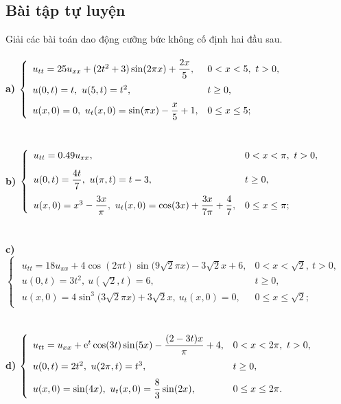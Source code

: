 \documentclass[10pt, a4paper]{article}
\begin{document}
	\subsection{Bài tập tự luyện}
	Giải các bài toán dao động cưỡng bức không cố định hai đầu sau.\\\\
	\textbf{a) } $\begin{cases}
		\begin{array}{ll}
			u_{tt}=25u_{xx}+(2t^2+3)\sin(2\pi x)+\dfrac{2x}{5}, & 0<x<5,~t>0,\\
			\noalign{\vskip5pt}
			u(0,t)=t,~u(5,t)=t^2, & t\ge0,\\
			\noalign{\vskip6pt}
			u(x,0)=0,~u_t(x,0)=\sin(\pi x)-\dfrac x5+1, & 0\le x\le5;
		\end{array}
	\end{cases}$\\\\\\
	\textbf{b) } $\begin{cases}
		\begin{array}{ll}
			u_{tt}=0.49u_{xx}, & 0<x<\pi,~t>0,\\
			\noalign{\vskip8pt}
			u(0,t)=\dfrac{4t}{7},~u(\pi,t)=t-3, & t\ge0,\\
			\noalign{\vskip7pt}
			u(x,0)=x^3-\dfrac{3x}{\pi},~u_t(x,0)=\cos(3x)+\dfrac{3x}{7\pi}+\dfrac47, & 0\le x\le\pi;
		\end{array}
	\end{cases}$\\\\\\
	\textbf{c) } $\begin{cases}
		\begin{array}{ll}
			u_{tt}=18u_{xx}+4\cos(2\pi t)\sin\big(9\sqrt2\pi x\big)-3\sqrt2x+6, & 0<x<\sqrt2,~t>0,\\
			u(0,t)=3t^2,~u(\sqrt2,t)=6,~ & t\ge0,\\
			u(x,0)=4\sin^3\big(3\sqrt2\pi x\big)+3\sqrt2x,~u_t(x,0)=0, & 0\le x\le\sqrt2;
		\end{array}
	\end{cases}$\\\\\\
	\textbf{d) } $\begin{cases}
		\begin{array}{ll}
			u_{tt}=u_{xx}+\mathrm e^t\cos(3t)\sin(5x)-\dfrac{(2-3t)x}{\pi}+4, & 0<x<2\pi,~t>0,\\
			\noalign{\vskip5pt}
			u(0,t)=2t^2,~u(2\pi,t)=t^3, & t\ge0,\\
			\noalign{\vskip6pt}
			u(x,0)=\sin(4x),~u_t(x,0)=\dfrac{8}{3}\sin(2x), & 0\le x\le2\pi.
		\end{array}
	\end{cases}$\\
\end{document}
